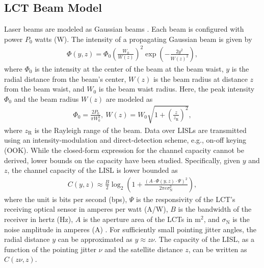 \documentclass[journal]{IEEEtran}
\begin{document}
\subsection{LCT Beam Model}
Laser beams are modeled as Gaussian beams \cite{saleh2019fundamentalsa}. 
Each beam is configured with power $P_0$ watts (W).
The intensity of a propagating Gaussian beam is given by
\begin{equation}
  \begin{aligned}
\Phi(y,z)=\Phi_0\left(\frac{W_0}{W(z)}\right)^2 \exp\!\left(-\frac{2y^2}{W(z)^2}\right),
  \end{aligned}
\end{equation}
where $\Phi_0$ is the intensity at the center of the beam at the beam waist, $y$ is the radial distance from the beam's center, $W(z)$ is the beam radius at distance $z$ from the beam waist, and $W_0$ is the beam waist radius.
Here, the peak intensity $\Phi_0$ and the beam radius $W(z)$ are modeled as
\begin{equation}
  \begin{aligned}
    \Phi_0 = \frac{2P_0}{\pi W_0^2}, \
    W(z)=W_0\sqrt{1+\left(\frac{z}{z_\mathrm{R}}\right)^2},
  \end{aligned}
\end{equation}
where $z_\mathrm{R}$ is the Rayleigh range of the beam.
Data over LISLs are transmitted using an intensity-modulation and direct-detection scheme, e.g., on-off keying (OOK). While the closed-form expression for the channel capacity cannot be derived, lower bounds on the capacity have been studied.
Specifically, given $y$ and $z$, the channel capacity of the LISL is lower bounded as \cite{farid2007outage,lapidoth2009capacity,chaaban2022capacity}
\begin{equation}
  \begin{aligned}
    C(y,z) \approx \frac{B}{2}\log_2
    \left(1+\frac{\left( A \cdot \Phi(y,z)\cdot \Psi  \right)^2}{2\pi e \sigma^2_{\mathrm{N}}} \right),
  \end{aligned}
\end{equation}
where the unit is bits per second (bps), $\Psi$ is the responsivity of the LCT's receiving optical sensor in amperes per watt (A/W), $B$ is the bandwidth of the receiver in hertz (Hz), $A$ is the aperture area of the LCTs in m$^2$, and $\sigma_{\mathrm{N}}$ is the noise amplitude in amperes (A) \cite{maxim_spf_transimpedance}.
For sufficiently small pointing jitter angles, the radial distance $y$ can be approximated as $y \approx z \nu$. 
The capacity of the LISL, as a function of the pointing jitter $\nu$ and the satellite distance $z$, can be written as $C(z \nu,z)$.
\end{document}

